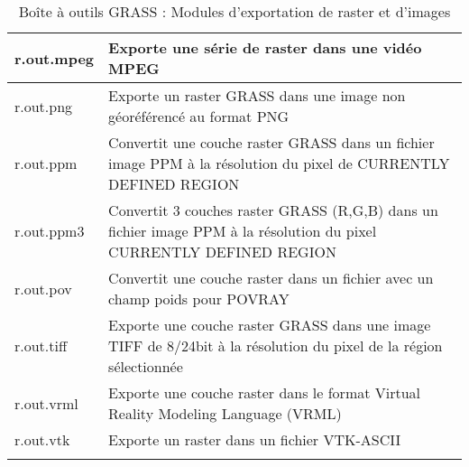 \begin{center}
{\begin{longtable}{|p{2.5cm}|p{11.5cm}|}
  \hline r.out.mpeg & Exporte une série de raster dans une vidéo MPEG \\
  \hline r.out.png & Exporte un raster GRASS dans une image non géoréférencé au format PNG \\
  \hline r.out.ppm & Convertit une couche raster GRASS dans un fichier image PPM à la résolution du pixel de CURRENTLY DEFINED REGION \\
  \hline r.out.ppm3 & Convertit 3 couches raster GRASS (R,G,B) dans un fichier image PPM à la résolution du pixel CURRENTLY DEFINED REGION \\
  \hline r.out.pov & Convertit une couche raster dans un fichier avec un champ poids pour POVRAY\\
  \hline r.out.tiff & Exporte une couche raster GRASS dans une image TIFF de 8/24bit à la résolution du pixel de la région sélectionnée\\
  \hline r.out.vrml & Exporte une couche raster dans le format Virtual Reality Modeling Language (VRML)\\
  \hline r.out.vtk & Exporte un raster dans un fichier VTK-ASCII \\
\hline
\caption{Boîte à outils GRASS : Modules d'exportation de raster et d'images}
\end{longtable}}
\end{center} 


